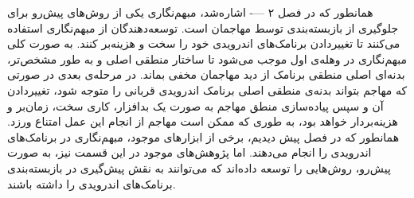همانطور که در فصل ۲ ---- اشاره‌شد، مبهم‌نگاری یکی از روش‌های پیش‌رو برای جلوگیری از بازبسته‌بندی توسط مهاجمان است. توسعه‌دهندگان از مبهم‌نگاری استفاده می‌کنند تا تغییردادن برنامک‌های اندرویدی خود را سخت و هزینه‌بر کنند. به صورت کلی مبهم‌نگاری در وهله‌ی اول موجب می‌شود تا ساختار منطقی اصلی و به طور مشخص‌تر، بدنه‌ای اصلی منطقی برنامک از دید مهاجمان مخفی بماند. در مرحله‌ی بعدی در صورتی که مهاجم بتواند بدنه‌‌ی منطقی اصلی برنامک‌ اندرویدی قربانی را متوجه شود، تغییردادن آن و سپس پیاده‌سازی منطق مهاجم به صورت یک بدافزار، کاری سخت، زمان‌بر و هزینه‌بردار خواهد بود، به طوری که ممکن است مهاجم از انجام این عمل امتناع ورزد. همانطور که در فصل پیش دیدیم، برخی از ابزار‌های موجود، مبهم‌نگاری در برنامک‌های اندرویدی را انجام می‌دهند. اما پژوهش‌های موجود در این قسمت نیز، به صورت پیش‌رو، روش‌هایی را توسعه داده‌اند که می‌توانند به نقش پیش‌گیری در بازبسته‌بندی برنامک‌های اندرویدی را داشته باشند.




















